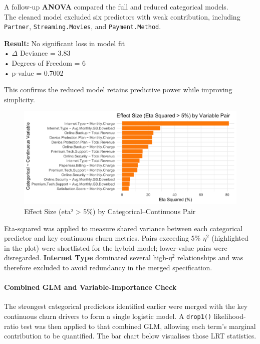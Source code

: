 \documentclass[
]{article}
\begin{document}
A follow-up \textbf{ANOVA} compared the full and reduced categorical
models.\\
The cleaned model excluded six predictors with weak contribution,
including \texttt{Partner}, \texttt{Streaming.Movies}, and
\texttt{Payment.Method}.

\textbf{Result:} No significant loss in model fit\\
• \(\Delta\) Deviance = 3.83\\
• Degrees of Freedom = 6\\
• p-value = 0.7002

This confirms the reduced model retains predictive power while improving
simplicity.

\begin{figure}

{\centering \includegraphics[width=0.85\linewidth]{glm_gam_plots/etasquare} 

}

\caption{Effect Size (eta² > 5\%) by Categorical–Continuous Pair}\label{fig:eta-square-img}
\end{figure}

Eta-squared was applied to measure shared variance between each
categorical predictor and key continuous churn metrics. Pairs exceeding
5\% \(\eta^2\) (highlighted in the plot) were shortlisted for the hybrid
model; lower-value pairs were disregarded. \textbf{Internet Type}
dominated several high-\(\eta^2\) relationships and was therefore
excluded to avoid redundancy in the merged specification.

\hypertarget{combined-glm-and-variable-importance-check}{%
\paragraph{Combined GLM and Variable-Importance
Check}\label{combined-glm-and-variable-importance-check}}

The strongest categorical predictors identified earlier were merged with
the key continuous churn drivers to form a single logistic model. A
\texttt{drop1()} likelihood-ratio test was then applied to that combined
GLM, allowing each term's marginal contribution to be quantified. The
bar chart below visualises those LRT statistics.
\end{document}
